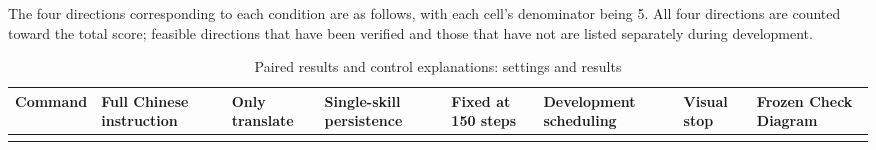 The four directions corresponding to each condition are as follows, with each cell's denominator being 5. All four directions are counted toward the total score; feasible directions that have been verified and those that have not are listed separately during development.

\FloatBarrier\begingroup\small\setlength{\tabcolsep}{2.5pt}
\begin{longtable}[]{@{}
  >{\raggedright\arraybackslash}p{}
  >{\raggedright\arraybackslash}p{}
  >{\raggedright\arraybackslash}p{}
  >{\raggedright\arraybackslash}p{}
  >{\raggedright\arraybackslash}p{}
  >{\raggedright\arraybackslash}p{}
  >{\raggedright\arraybackslash}p{}
  >{\raggedright\arraybackslash}p{}@{}}
\caption{Paired results and control explanations: settings and results}\label{tab:s13-4}\tabularnewline
\toprule\noalign{}
\begin{minipage}[b]{\linewidth}\raggedright
Command
\end{minipage} & \begin{minipage}[b]{\linewidth}\raggedright
Full Chinese instruction
\end{minipage} & \begin{minipage}[b]{\linewidth}\raggedright
Only translate
\end{minipage} & \begin{minipage}[b]{\linewidth}\raggedright
Single-skill persistence
\end{minipage} & \begin{minipage}[b]{\linewidth}\raggedright
Fixed at 150 steps
\end{minipage} & \begin{minipage}[b]{\linewidth}\raggedright
De\-vel\-op\-ment sched\-ul\-ing
\end{minipage} & \begin{minipage}[b]{\linewidth}\raggedright
Visual stop
\end{minipage} & \begin{minipage}[b]{\linewidth}\raggedright
Frozen Check Diagram
\end{minipage} \\
\midrule\noalign{}
\endfirsthead
\toprule\noalign{}
\begin{minipage}[b]{\linewidth}\raggedright

\end{minipage}
\end{longtable}
